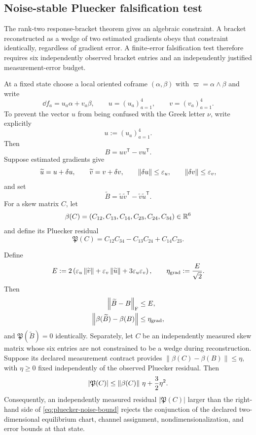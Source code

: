 \subsection{Noise-stable Pluecker falsification test}

The rank-two response-bracket theorem gives an algebraic constraint. A
bracket reconstructed as a wedge of two estimated gradients obeys that
constraint identically, regardless of gradient error. A finite-error
falsification test therefore requires six independently observed bracket
entries and an independently justified measurement-error budget.

At a fixed state choose a local oriented coframe $(\alpha,\beta)$ with $\varpi=\alpha\wedge\beta$ and write
\[
\dd f_a=u_a\alpha+v_a\beta,
\qquad
u=(u_a)_{a=1}^4,
\qquad
v=(v_a)_{a=1}^4.
\]
To prevent the vector $u$ from being confused with the Greek letter $\nu$, write explicitly
\[
u:=(u_a)_{a=1}^4.
\]
Then
\[
B=uv^{\mathsf T}-vu^{\mathsf T}.
\]
Suppose estimated gradients give
\[
\widetilde u=u+\delta u,
\qquad
\widetilde v=v+\delta v,
\qquad
\left\lVert\delta u\right\rVert\le\varepsilon_u,
\qquad
\left\lVert\delta v\right\rVert\le\varepsilon_v,
\]
and set
\[
\widetilde B=\widetilde u\widetilde v^{\mathsf T}
-\widetilde v\widetilde u^{\mathsf T}.
\]
For a skew matrix $C$, let
\[
\beta(C)=(C_{12},C_{13},C_{14},C_{23},C_{24},C_{34})\in\mathbb R^6
\]
and define its Pluecker residual
\[
\mathfrak P(C)
=C_{12}C_{34}-C_{13}C_{24}+C_{14}C_{23}.
\]

\begin{theorem}
\label{thm:noise-stable-pluecker}
Define
\begin{equation}
E
:=2\left(
\varepsilon_u\left\lVert\widetilde v\right\rVert
+\varepsilon_v\left\lVert\widetilde u\right\rVert
+3\varepsilon_u\varepsilon_v
\right),
\qquad
\eta_{\rm grad}:=\frac{E}{\sqrt2}.
\label{eq:measured-bracket-error}
\end{equation}
Then
\begin{align}
\left\lVert\widetilde B-B\right\rVert_{\mathrm F}&\le E,
\label{eq:bracket-frobenius-error}\\
\left\lVert\beta(\widetilde B)-\beta(B)\right\rVert&\le\eta_{\rm grad},
\label{eq:bracket-six-error}
\end{align}
and $\mathfrak P(\widetilde B)=0$ identically. Separately, let $C$ be an
independently measured skew matrix whose six entries are not constrained to
be a wedge during reconstruction. Suppose its declared measurement contract
provides $\|\beta(C)-\beta(B)\|\le\eta$, with $\eta\ge0$ fixed independently
of the observed Pluecker residual. Then
\begin{equation}
\left|\mathfrak P(C)\right|
\le
\left\lVert\beta(C)\right\rVert\,\eta
+\frac32\eta^2.
\label{eq:pluecker-noise-bound}
\end{equation}
Consequently, an independently measured residual $|\mathfrak P(C)|$ larger than the right-hand side of \eqref{eq:pluecker-noise-bound} rejects the conjunction of the declared two-dimensional equilibrium chart, channel assignment, nondimensionalization, and error bounds at that state.
\end{theorem}

